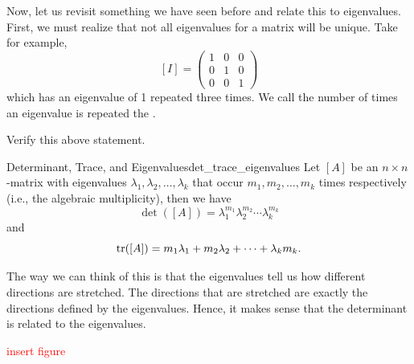         Now, let us revisit something we have seen before and relate this to eigenvalues. First, we must realize that not all eigenvalues for a matrix will be unique.  Take for example,
        \[
        [I]=\begin{pmatrix} 1 & 0 & 0 \\ 0 & 1 & 0 \\ 0 & 0 & 1 \end{pmatrix}
        \]
        which has an eigenvalue of 1 repeated three times. We call the number of times an eigenvalue is repeated the . 
        
        \begin{exercise}
        Verify this above statement.
        \end{exercise}
        
        \begin{thm}{Determinant, Trace, and Eigenvalues}{det_trace_eigenvalues}
            Let $[A]$ be an $n\times n$-matrix with eigenvalues $\lambda_1,\lambda_2,\dots,\lambda_k$ that occur $m_1,m_2,\dots,m_k$ times respectively (i.e., the algebraic multiplicity), then we have
            \[
            \det([A])=\lambda_1^{m_1} \lambda_2^{m_2} \cdots \lambda_k^{m_k}
            \]
            and
            \[
            \mathrm{tr}([A])=m_1 \lambda_1 + m_2 \lambda_2 + \cdots + \lambda_k m_k.
            \]
        \end{thm}
        
        The way we can think of this is that the eigenvalues tell us how different directions are stretched. The directions that are stretched are exactly the directions defined by the eigenvalues. Hence, it makes sense that the determinant is related to the eigenvalues. 
        
        \textcolor{red}{insert figure}
        
